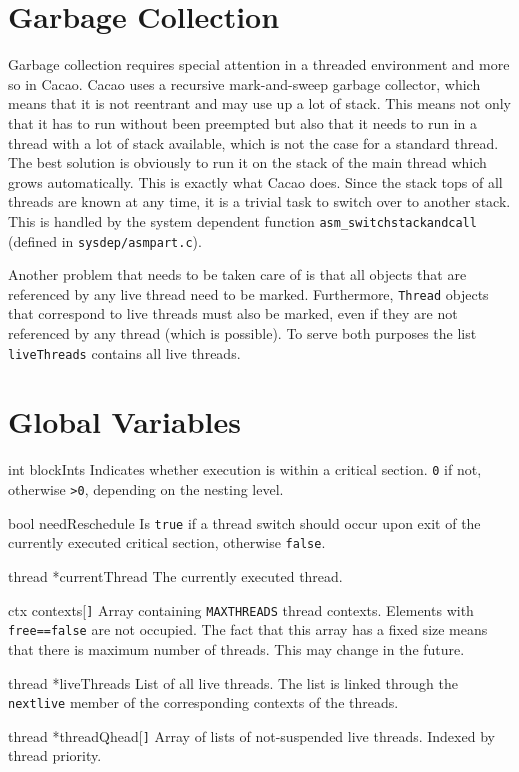 \documentclass[twocolumn,a4paper]{article}      %
\newcommand{\globvarslabel}[1]{\mbox{\texttt{#1}}\hfil}
\newenvironment{globvars}
    {\begin{list}{}%
           {\renewcommand{\makelabel}{\globvarslabel}%
           }%
    }%
    {\end{list}}
\begin{document}
\section{Garbage Collection}
\label{sec:gc}

Garbage collection requires special attention in a threaded
environment and more so in Cacao.  Cacao uses a recursive
mark-and-sweep garbage collector, which means that it is not reentrant
and may use up a lot of stack. This means not only that it has to run
without been preempted but also that it needs to run in a thread with
a lot of stack available, which is not the case for a standard
thread. The best solution is obviously to run it on the stack of the
main thread which grows automatically. This is exactly what Cacao
does. Since the stack tops of all threads are known at any time, it is
a trivial task to switch over to another stack. This is handled by the
system dependent function \texttt{asm\_switchstackandcall} (defined in
\texttt{sysdep/asmpart.c}).

Another problem that needs to be taken care of is that all objects
that are referenced by any live thread need to be marked. Furthermore,
\texttt{Thread} objects that correspond to live threads must also be
marked, even if they are not referenced by any thread (which is
possible). To serve both purposes the list \texttt{liveThreads}
contains all live threads.

\section{Global Variables}
\label{sec:globalvars}

\begin{globvars}

\item[int blockInts] Indicates whether execution is within a critical section. \texttt{0} if
    not, otherwise \texttt{>0}, depending on the nesting level.

\item[bool needReschedule] Is \texttt{true} if a thread switch should occur upon exit of
    the currently executed critical section, otherwise \texttt{false}.

\item[thread *currentThread] The currently executed thread.

\item[ctx contexts[\texttt{]}] Array containing \texttt{MAXTHREADS} thread contexts.
    Elements with
    \texttt{free==false} are not occupied. The fact that this array has a fixed size means
    that there is maximum number of threads. This may change in the future.

\item[thread *liveThreads] List of all live threads. The list is linked through the
    \texttt{nextlive} member of the corresponding contexts of the threads.

\item[thread *threadQhead[\texttt{]}] Array of lists of not-suspended live threads. Indexed
    by thread priority.

\end{globvars}
\end{document}
